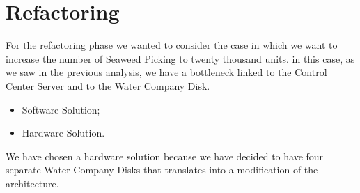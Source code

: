 \section{Refactoring}

For the refactoring phase we wanted to consider the case in which we want to increase the number of Seaweed Picking to twenty thousand units. in this case, as we saw in the previous analysis, we have a bottleneck linked to the Control Center Server and to the Water Company Disk.

\begin{itemize}
	\item Software Solution;
	\item Hardware Solution.
\end{itemize}

We have chosen a hardware solution because we have decided to have four separate Water Company Disks that translates into a modification of the architecture.\\ %
